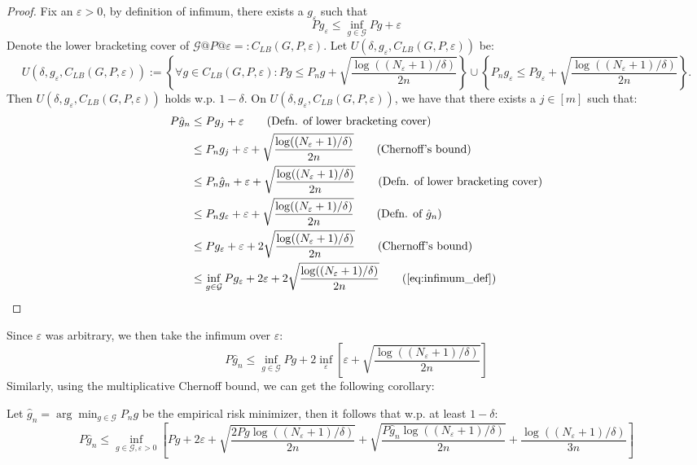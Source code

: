 \documentclass[twoside]{article}
\begin{document}
\begin{proof}
   Fix an $\varepsilon>0$, by definition of infimum, there exists a $g_\varepsilon$ such that 
   \begin{equation}
      Pg_\varepsilon\le \inf_{g\in \mathcal G}Pg+\varepsilon\label{eq:infimum_def}
   \end{equation}
   Denote the lower bracketing cover of $\mathcal G\text{@}P\text{@}\varepsilon=:C_{LB}(G,P,\varepsilon)$. Let $U(\delta,g_\varepsilon,C_{LB}(G,P,\varepsilon))$ be:
   \begin{equation*}
      U(\delta,g_\varepsilon,C_{LB}(G,P,\varepsilon)):=\left\{\forall g\in C_{LB}(G,P,\varepsilon): Pg\le P_ng+\sqrt{\frac{\log((N_\varepsilon+1)/\delta)}{2n}}\right\}\cup\left\{P_ng_\varepsilon\le Pg_\varepsilon+\sqrt{\frac{\log((N_\varepsilon+1)/\delta)}{2n}}\right\}.
   \end{equation*}
   Then $U(\delta,g_\varepsilon,C_{LB}(G,P,\varepsilon))$ holds w.p. $1-\delta$. On $U(\delta,g_\varepsilon,C_{LB}(G,P,\varepsilon))$, we have that there exists a $j\in [m]$ such that:
   \begin{align*}
      P\hat g_n&\le Pg_j+\varepsilon\tag{Defn. of lower bracketing cover}\\
      &\le P_ng_j+\varepsilon+\sqrt{\frac{\log((N_\varepsilon+1)/\delta)}{2n}}\tag{Chernoff's bound}\\
      &\le P_n\hat g_n+\varepsilon+\sqrt{\frac{\log((N_\varepsilon+1)/\delta)}{2n}}\tag{Defn. of lower bracketing cover}\\
      &\le P_n g_\varepsilon+\varepsilon+\sqrt{\frac{\log((N_\varepsilon+1)/\delta)}{2n}}\tag{Defn. of $\hat g_n$}\\
      &\le P g_\varepsilon+\varepsilon+2\sqrt{\frac{\log((N_\varepsilon+1)/\delta)}{2n}}\tag{Chernoff's bound}\\
      &\le \inf_{g\in \mathcal G}Pg_\varepsilon+2\varepsilon+2\sqrt{\frac{\log((N_\varepsilon+1)/\delta)}{2n}}\tag{\cref{eq:infimum_def}}
   \end{align*}
\end{proof}
Since $\varepsilon$ was arbitrary, we then take the infimum over $\varepsilon$:
\begin{equation*}
   P\hat g_n\le \inf_{g\in \mathcal G}Pg + 2\inf_{\varepsilon}\left[\varepsilon+ \sqrt{\frac{\log((N_\varepsilon+1)/\delta)}{2n}}\right]
\end{equation*}
Similarly, using the multiplicative Chernoff bound, we can get the following corollary:
\begin{corollary}
   Let $\hat g_n=\arg\min_{g\in \mathcal{G}}P_ng$ be the empirical risk minimizer, then it follows that w.p. at least $1-\delta$:
   \begin{equation*}
      P\hat g_n\le \inf_{g\in \mathcal G, \varepsilon>0}\left[Pg + 2\varepsilon+ \sqrt{\frac{2Pg\log((N_\varepsilon+1)/\delta)}{2n}}+\sqrt{\frac{P\hat g_n\log(({N_\varepsilon+1})/{\delta})}{2n}}+\frac{\log(({N_\varepsilon+1})/{\delta})}{3n}\right]
   \end{equation*}
\end{corollary}

% 
\end{document}
